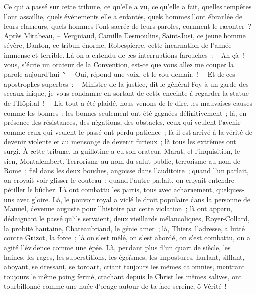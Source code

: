 \documentclass[french,twoside]{book} %
\begin{document}
Ce qui a passé sur cette tribune, ce qu’elle a vu, ce qu’elle a fait, quelles tempêtes l’ont assaillie, quels événements elle a enfantés, quels hommes l’ont ébranlée de leurs clameurs, quels hommes l’ont sacrée de leurs paroles, comment le raconter ? Après Mirabeau, – Vergniaud, Camille Desmoulins, Saint-Just, ce jeune homme sévère, Danton, ce tribun énorme, Robespierre, cette incarnation de l’année immense et terrible. Là on a entendu de ces interruptions farouches : – Ah çà ! vous, s’écrie un orateur de la Convention, est-ce que vous allez me couper la parole aujourd’hui ? – Oui, répond une voix, et le cou demain ! – Et de ces apostrophes superbes : – Ministre de la justice, dit le général Foy à un garde des sceaux inique, je vous condamne en sortant de cette enceinte à regarder la statue de l’Hôpital ! – Là, tout a été plaidé, nous venons de le dire, les mauvaises causes comme les bonnes ; les bonnes seulement ont été gagnées définitivement ; là, en présence des résistances, des négations, des obstacles, ceux qui veulent l’avenir comme ceux qui veulent le passé ont perdu patience ; là il est arrivé à la vérité de devenir violente et au mensonge de devenir furieux ; là tous les extrêmes ont surgi. À cette tribune, la guillotine a eu son orateur, Marat, et l’inquisition, le sien, Montalembert. Terrorisme au nom du salut public, terrorisme au nom de Rome ; fiel dans les deux bouches, angoisse dans l’auditoire ; quand l’un parlait, on croyait voir glisser le couteau ; quand l’autre parlait, on croyait entendre pétiller le bûcher. Là ont combattu les partis, tous avec acharnement, quelques-uns avec gloire. Là, le pouvoir royal a violé le droit populaire dans la personne de Manuel, devenue auguste pour l’histoire par cette violation ; là ont apparu, dédaignant le passé qu’ils servaient, deux vieillards mélancoliques, Royer-Collard, la probité hautaine, Chateaubriand, le génie amer ; là, Thiers, l’adresse, a lutté contre Guizot, la force ; là on s’est mêlé, on s’est abordé, on s’est combattu, on a agité l’évidence comme une épée. Là, pendant plus d’un quart de siècle, les haines, les rages, les superstitions, les égoïsmes, les impostures, hurlant, sifflant, aboyant, se dressant, se tordant, criant toujours les mêmes calomnies, montrant toujours le même poing fermé, crachant depuis le Christ les mêmes salives, ont tourbillonné comme une nuée d’orage autour de ta face sereine, ô Vérité !
\end{document}
